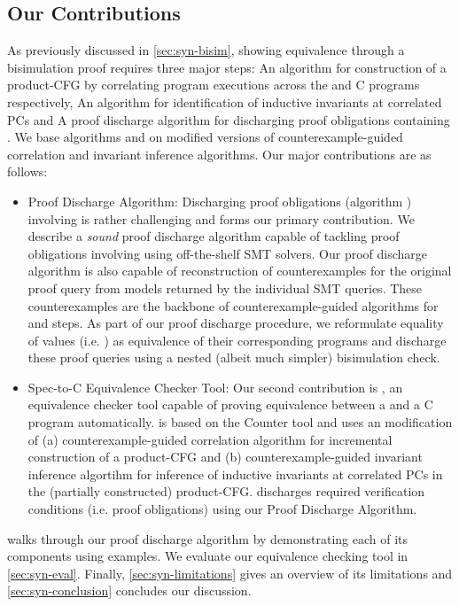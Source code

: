 \subsection{Our Contributions}
\label{sec:syn-contribs}
As previously discussed in \cref{sec:syn-bisim}, showing equivalence through a bisimulation proof
requires three major steps:
 An algorithm for construction of a product-CFG by correlating
program executions across the \SpecL{} and C programs respectively,
 An algorithm for identification of inductive invariants at correlated PCs and
 A proof discharge algorithm for discharging proof obligations containing \recursiveRelations{}.
We base algorithms  and  on modified versions of counterexample-guided correlation
and invariant inference algorithms\cite{oopsla20}. Our major contributions are as follows:

\begin{itemize}
\setlength{\itemsep}{0px}
\item Proof Discharge Algorithm: Discharging proof obligations (algorithm )
involving \recursiveRelations{} is rather challenging and forms our primary contribution.
We describe a {\em sound} proof discharge algorithm capable of tackling proof obligations involving
\recursiveRelations{} using off-the-shelf SMT solvers. Our proof discharge algorithm is also capable of
reconstruction of counterexamples for the original proof query from models returned by the individual SMT queries.
These counterexamples are the backbone of counterexample-guided algorithms for
 and  steps. As part of our proof discharge procedure,
we reformulate equality of values (i.e. \recursiveRelations{}) as equivalence of their corresponding programs
and discharge these proof queries using a nested (albeit much simpler) bisimulation check.

\item Spec-to-C Equivalence Checker Tool: Our second contribution is \toolName{}, an equivalence checker tool
capable of proving equivalence between a \SpecL{} and a C program automatically. \toolName{} is based on
the Counter tool\cite{oopsla20} and uses an modification of (a) counterexample-guided correlation algorithm for
incremental construction of a product-CFG and (b) counterexample-guided invariant inference algortihm
for inference of inductive invariants at correlated PCs in the (partially constructed) product-CFG.
\toolName{} discharges required verification conditions (i.e. proof obligations) using our Proof Discharge Algorithm.
\end{itemize}

 walks through our proof discharge algorithm by demonstrating each of its
components using examples. We evaluate our equivalence checking tool \toolName{} in \cref{sec:syn-eval}.
Finally, \cref{sec:syn-limitations} gives an overview of its limitations and \cref{sec:syn-conclusion} concludes our discussion.